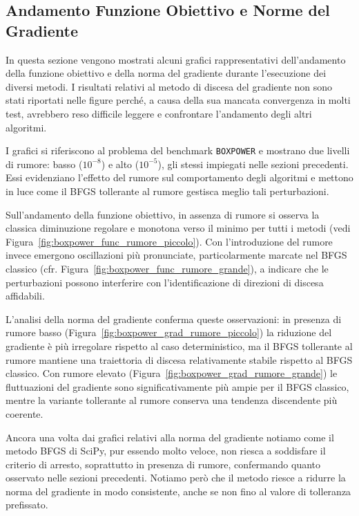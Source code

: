 \newpage
\subsection{Andamento Funzione Obiettivo e Norme del Gradiente}
In questa sezione vengono mostrati alcuni grafici rappresentativi dell’andamento della funzione obiettivo e della norma del gradiente durante l’esecuzione dei diversi metodi. I risultati relativi al metodo di discesa del gradiente non sono stati riportati nelle figure perché, a causa della sua mancata convergenza in molti test, avrebbero reso difficile leggere e confrontare l’andamento degli altri algoritmi.

I grafici si riferiscono al problema del benchmark \texttt{BOXPOWER} e mostrano due livelli di rumore: basso (\(10^{-8}\)) e alto (\(10^{-5}\)), gli stessi impiegati nelle sezioni precedenti. Essi evidenziano l’effetto del rumore sul comportamento degli algoritmi e mettono in luce come il BFGS tollerante al rumore gestisca meglio tali perturbazioni.

Sull’andamento della funzione obiettivo, in assenza di rumore si osserva la classica diminuzione regolare e monotona verso il minimo per tutti i metodi (vedi Figura~\ref{fig:boxpower_func_rumore_piccolo}). Con l’introduzione del rumore invece emergono oscillazioni più pronunciate, particolarmente marcate nel BFGS classico (cfr. Figura~\ref{fig:boxpower_func_rumore_grande}), a indicare che le perturbazioni possono interferire con l’identificazione di direzioni di discesa affidabili.

L’analisi della norma del gradiente conferma queste osservazioni: in presenza di rumore basso (Figura~\ref{fig:boxpower_grad_rumore_piccolo}) la riduzione del gradiente è più irregolare rispetto al caso deterministico, ma il BFGS tollerante al rumore mantiene una traiettoria di discesa relativamente stabile rispetto al BFGS classico. Con rumore elevato (Figura~\ref{fig:boxpower_grad_rumore_grande}) le fluttuazioni del gradiente sono significativamente più ampie per il BFGS classico, mentre la variante tollerante al rumore conserva una tendenza discendente più coerente.

Ancora una volta dai grafici relativi alla norma del gradiente notiamo come il metodo BFGS di SciPy, pur essendo molto veloce, non riesca a soddisfare il criterio di arresto, soprattutto in presenza di rumore, confermando quanto osservato nelle sezioni precedenti. Notiamo però che il metodo riesce a ridurre la norma del gradiente in modo consistente, anche se non fino al valore di tolleranza prefissato.

